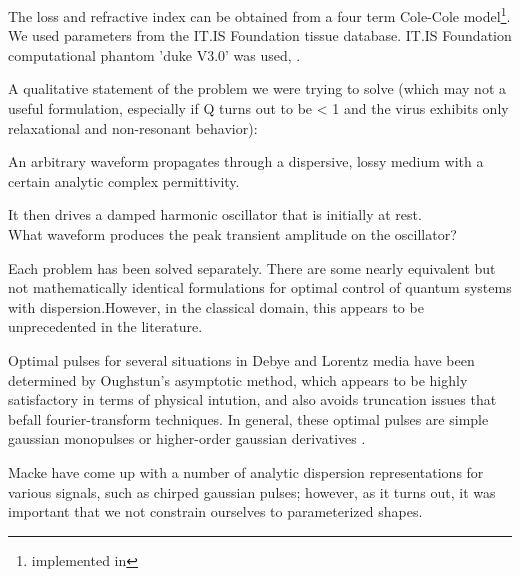 \documentclass[paper.tex]{subfiles}
\begin{document}
The loss and refractive index can be obtained from a four term Cole-Cole model\cite{gabriel1996compilation}\footnote{implemented in}. We used parameters from the IT.IS Foundation tissue database\cite{Tissue2018a}. IT.IS Foundation computational phantom 'duke V3.0' was used, \cite{Duke2014}.


\pagebreak
A qualitative statement of the problem we were trying to solve (which may not a useful formulation, especially if Q turns out to be < 1 and the virus exhibits only relaxational and non-resonant behavior):

\begin{toolchain}
An arbitrary waveform propagates through a dispersive, lossy medium with a certain analytic complex 
permittivity. 

It then drives a damped harmonic oscillator that is initially at rest.\\

What waveform produces the peak transient amplitude on the oscillator?
\end{toolchain}


Each problem has been solved separately. There are some nearly equivalent but not mathematically identical formulations for optimal control of quantum systems with dispersion.\footnotemark However, in the classical domain, this appears to be unprecedented in the literature.



Optimal pulses for several situations in Debye and Lorentz media have been determined by Oughstun's asymptotic method, which appears to be highly satisfactory in terms of physical intution, and also avoids truncation issues that befall fourier-transform techniques. In general, these optimal pulses are simple gaussian monopulses or higher-order gaussian derivatives \cite{Optimal2017} \cite{Optimal2015}. 

Macke \cite{Simple2012} have come up with a number of analytic dispersion representations for various signals, such as chirped gaussian pulses; however, as it turns out, it was important that we not constrain ourselves to parameterized shapes.
\end{document}
